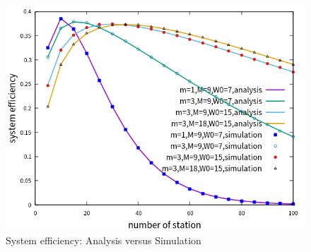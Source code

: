 \begin{figure}[!h]
    \centering
\includegraphics[scale=0.74]{./figure/chp3/multiple_parameter.png}
\caption{System efficiency: Analysis versus Simulation}
\label{validation}
\end{figure}
